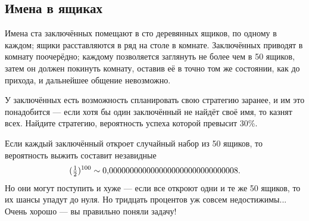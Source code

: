 \subsection*{Имена в ящиках}\label{Имена в ящиках}

Имена ста заключённых помещают в сто деревянных ящиков, по одному в каждом;
ящики расставляются в ряд на столе в комнате.
Заключённых приводят в комнату поочерёдно;
каждому позволяется заглянуть не более чем в 50 ящиков,
затем он должен покинуть комнату, оставив её в точно том же состоянии, как до прихода, и дальнейшее общение невозможно.

У заключённых есть возможность спланировать свою стратегию заранее, и им это понадобится --- если хотя бы один заключённый не найдёт своё имя, то казнят всех.
Найдите стратегию, вероятность успеха которой превысит 30\%.

 Если каждый заключённый откроет случайный набор из 50 ящиков, то вероятность выжить составит незавидные
\[(\tfrac12)^{100}\z\sim 0{,}0000000000000000000000000000008.\]
Но они могут поступить и хуже --- если все откроют одни и те же 50 ящиков, то их шансы упадут до нуля.
Но тридцать процентов уж совсем недостижимы...
Очень хорошо --- вы правильно поняли задачу!
